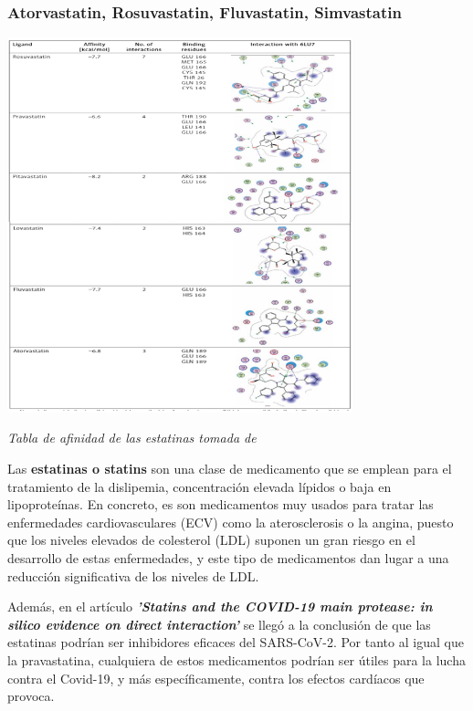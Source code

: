 \subsubsection{Atorvastatin, Rosuvastatin, Fluvastatin, Simvastatin}

\begin{center}
\includegraphics[width=100mm,scale=1]{report/figures/statins.PNG}


\caption{\textit{Tabla de afinidad de las estatinas tomada de \cite{Reiner2020StatinsInteraction} }}
\end{center}

Las \textbf{estatinas o statins} son una clase de medicamento que se emplean para el tratamiento de la dislipemia, concentración elevada lípidos o baja en lipoproteínas. En
concreto, es son medicamentos muy usados para tratar las enfermedades cardiovasculares (ECV) como la aterosclerosis o la angina, puesto que los niveles elevados de colesterol
(LDL) suponen un gran riesgo en el desarrollo de estas enfermedades, y este tipo de medicamentos dan lugar a una reducción significativa  de los niveles de LDL.

Además, en el artículo \textbf{\textit{'Statins and the COVID-19 main protease: in silico evidence on direct interaction' }}se llegó a la conclusión de que las estatinas podrían
ser inhibidores eficaces del SARS-CoV-2. Por tanto al igual que la pravastatina, cualquiera de estos medicamentos podrían ser útiles para la lucha contra el Covid-19, y más
específicamente, contra los efectos cardíacos que provoca.\newline

